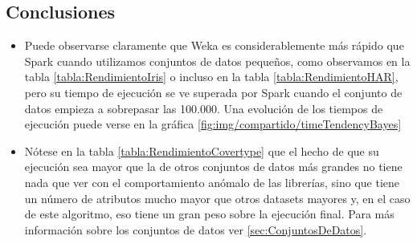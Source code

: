 \subsection{Conclusiones}\label{ConclusionesWekaSpark}
\begin{itemize}
	\item Puede observarse claramente que Weka es considerablemente más rápido que Spark cuando utilizamos conjuntos de datos pequeños, como observamos en la tabla \ref{tabla:RendimientoIris} o incluso en la tabla \ref{tabla:RendimientoHAR}, pero su tiempo de ejecución se ve superada por Spark cuando el conjunto de datos empieza a sobrepasar las 100.000. Una evolución de los tiempos de ejecución puede verse en la gráfica \ref{fig:img/compartido/timeTendencyBayes}

	\item Nótese en la tabla \ref{tabla:RendimientoCovertype} que el hecho de que su ejecución sea mayor que la de otros conjuntos de datos más grandes no tiene nada que ver con el comportamiento anómalo de las librerías, sino que tiene un número de atributos mucho mayor que otros datasets mayores y, en el caso de este algoritmo, eso tiene un gran peso sobre la ejecución final. Para más información sobre los conjuntos de datos ver \ref{sec:ConjuntosDeDatos}.
	

\end{itemize}
